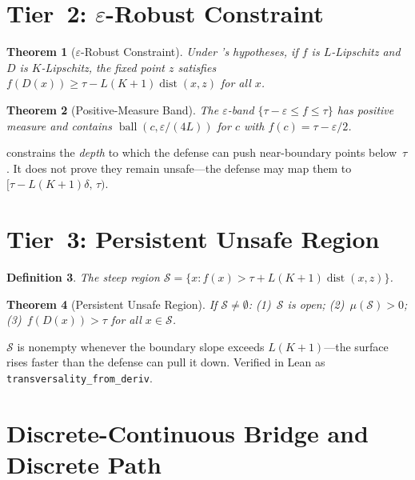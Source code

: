 \documentclass[11pt]{article}
\newtheorem{theorem}{Theorem}[section]
\newtheorem{definition}[theorem]{Definition}
\newcommand{\dist}{\operatorname{dist}}
\begin{document}
\section{Tier~2: $\varepsilon$-Robust Constraint}
\label{sec:eps-robust}

\begin{theorem}[$\varepsilon$-Robust Constraint]
\label{thm:eps-robust}
Under 's hypotheses, if $f$ is $L$-Lipschitz and $D$ is $K$-Lipschitz, the fixed point $z$ satisfies $f(D(x)) \geq \tau - L(K+1)\dist(x,z)$ for all $x$.
\end{theorem}

\begin{theorem}[Positive-Measure Band]
\label{thm:band-measure}
The $\varepsilon$-band $\{\tau - \varepsilon \leq f \leq \tau\}$ has positive measure and contains $\operatorname{ball}(c, \varepsilon/(4L))$ for $c$ with $f(c) = \tau - \varepsilon/2$.
\end{theorem}

 constrains the \emph{depth} to which the defense can push near-boundary points below~$\tau$. It does not prove they remain unsafe---the defense may map them to $[\tau - L(K+1)\delta,\, \tau)$.

\section{Tier~3: Persistent Unsafe Region}
\label{sec:persistent}

\begin{definition}
The \emph{steep region} $\mathcal{S} = \{x : f(x) > \tau + L(K+1)\dist(x,z)\}$.
\end{definition}

\begin{theorem}[Persistent Unsafe Region]
\label{thm:persistent}
If $\mathcal{S} \neq \emptyset$: (1)~$\mathcal{S}$ is open; (2)~$\mu(\mathcal{S}) > 0$; (3)~$f(D(x)) > \tau$ for all $x \in \mathcal{S}$.
\end{theorem}

$\mathcal{S}$ is nonempty whenever the boundary slope exceeds $L(K+1)$---the surface rises faster than the defense can pull it down. Verified in Lean as \texttt{transversality\_from\_deriv}.

\section{Discrete-Continuous Bridge and Discrete Path}
\label{sec:bridge}
\end{document}
